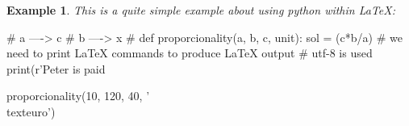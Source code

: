 \documentclass[12pt,a4paper]{report}
\newtheorem{example}{Example}
\begin{document}
\begin{example}
This is a quite simple example about using python within \LaTeX:
\end{example}

\begin{python}
# a ----> c
# b ----> x
#
def proporcionality(a, b, c, unit):
sol = (c*b/a)
  # we need to print LaTeX commands to produce LaTeX output
  # utf-8 is used
  print(r'Peter is paid %

proporcionality(10, 120, 40, '\\texteuro')
\end{python}
\end{document}
